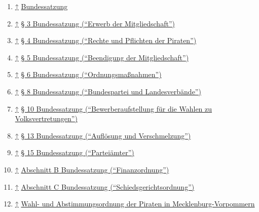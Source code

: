 \begin{enumerate}
\item
  \href{\#cite\_ref-0}{↑} \href{/Bundessatzung}{Bundessatzung}
\item
  \href{\#cite\_ref-1}{↑}
  \href{/Bundessatzung\#.C2.A7\_3\_-\_Erwerb\_der\_Mitgliedschaft}{§ 3
  Bundessatzung (``Erwerb der Mitgliedschaft'')}
\item
  \href{\#cite\_ref-2}{↑}
  \href{/Bundessatzung\#.C2.A7\_4\_-\_Rechte\_und\_Pflichten\_der\_Piraten}{§
  4 Bundessatzung (``Rechte und Pflichten der Piraten'')}
\item
  \href{\#cite\_ref-3}{↑}
  \href{/Bundessatzung\#.C2.A7\_5\_-\_Beendigung\_der\_Mitgliedschaft}{§
  5 Bundessatzung (``Beendigung der Mitgliedschaft'')}
\item
  \href{\#cite\_ref-4}{↑}
  \href{/Bundessatzung\#.C2.A7\_6\_-\_Ordnungsma.C3.9Fnahmen}{§ 6
  Bundessatzung (``Ordnungsmaßnahmen'')}
\item
  \href{\#cite\_ref-5}{↑}
  \href{/Bundessatzung\#.C2.A7\_8\_-\_Bundespartei\_und\_Landesverb.C3.A4nde}{§
  8 Bundessatzung (``Bundespartei und Landesverbände'')}
\item
  \href{\#cite\_ref-6}{↑}
  \href{/Bundessatzung\#.C2.A7\_10\_-\_Bewerberaufstellung\_f.C3.BCr\_die\_Wahlen\_zu\_Volksvertretungen}{§
  10 Bundessatzung (``Bewerberaufstellung für die Wahlen zu
  Volksvertretungen'')}
\item
  \href{\#cite\_ref-7}{↑}
  \href{/Bundessatzung\#.C2.A7\_13\_-\_Aufl.C3.B6sung\_und\_Verschmelzung}{§
  13 Bundessatzung (``Auflösung und Verschmelzung'')}
\item
  \href{\#cite\_ref-8}{↑}
  \href{/Bundessatzung\#.C2.A7\_15\_-\_Partei.C3.A4mter}{§ 15
  Bundessatzung (``Parteiämter'')}
\item
  \href{\#cite\_ref-9}{↑}
  \href{/Bundessatzung\#Abschnitt\_B:\_Finanzordnung}{Abschnitt B
  Bundessatzung (``Finanzordnung'')}
\item
  \href{\#cite\_ref-10}{↑}
  \href{/Bundessatzung\#Abschnitt\_C:\_Schiedsgerichtsordnung}{Abschnitt
  C Bundessatzung (``Schiedsgerichtsordnung'')}
\item
  \href{\#cite\_ref-11}{↑} \href{/MV:Wahlordnung}{Wahl- und
  Abstimmungsordnung der Piraten in Mecklenburg-Vorpommern}
\end{enumerate}
